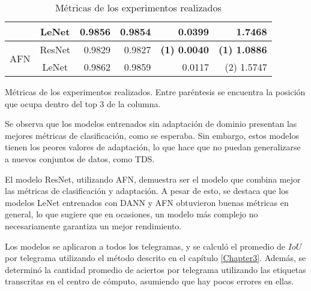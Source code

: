 \begin{table}[H]
\begin{tabular}{cc|rr|rr}
                                     & LeNet  & 0.9856                              & 0.9854                              & 0.0399                              & 1.7468                              \\\hline
        \multirow[c]{2}{*}{AFN}      & ResNet & 0.9829                              & 0.9827                              & \textbf{{\footnotesize (1)} 0.0040} & \textbf{{\footnotesize (1)} 1.0886} \\
                                     & LeNet  & 0.9862                              & 0.9859                              & 0.0117                              & {\footnotesize (2)} 1.5747          \\

        \bottomrule
    \end{tabular}
    \caption{Métricas de los experimentos realizados}{Métricas de los experimentos realizados. Entre paréntesis se encuentra la posición que ocupa dentro del top 3 de la columna.}
    \label{tab:metricas-experimentos}
\end{table}

Se observa que los modelos entrenados sin adaptación de dominio presentan las mejores métricas de clasificación, como
se esperaba. Sin embargo, estos modelos tienen los peores valores de adaptación, lo que hace que no puedan
generalizarse a nuevos conjuntos de datos, como TDS.

El modelo ResNet, utilizando AFN, demuestra ser el modelo que combina mejor las métricas de clasificación y adaptación.
A pesar de esto, se destaca que los modelos LeNet entrenados con DANN y AFN obtuvieron buenas métricas en general, lo
que sugiere que en ocasiones, un modelo más complejo no necesariamente garantiza un mejor rendimiento.

Los modelos se aplicaron a todos los telegramas, y se calculó el promedio de $IoU$ por telegrama utilizando el método
descrito en el capítulo \ref{Chapter3}. Además, se determinó la cantidad promedio de aciertos por telegrama utilizando
las etiquetas transcritas en el centro de cómputo, asumiendo que hay pocos errores en ellas.

